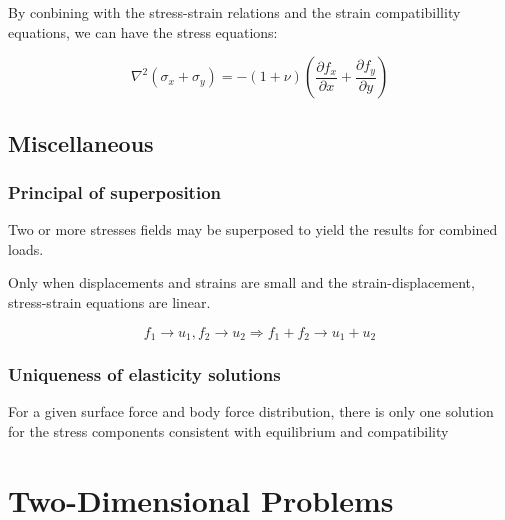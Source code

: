\documentclass[en,hazy,cyan,8pt,normal]{elegantnote}
\numberwithin{equation}{section}
\begin{document}
    By conbining with the stress-strain relations and the strain compatibillity equations, we can have the stress equations:

    \begin{equation}\label{eq:079}
      \nabla^2 (\sigma_x+\sigma_y) = -(1+\nu)\left( \frac{\partial f_x}{\partial x} + \frac{\partial f_y}{\partial y}\right)
    \end{equation}

  \subsection{Miscellaneous}\label{subsec:04.03}
    \subsubsection{Principal of superposition}\label{subsubsec:04.03.01}

      Two or more stresses fields may be superposed to yield the results for combined loads.

      Only when displacements and strains are small and the strain-displacement, stress-strain equations are linear.

      \begin{equation}\label{eq:080}
        f_1\rightarrow u_1, f_2\rightarrow u_2 \Rightarrow f_1+f_2 \rightarrow u_1 + u_2
      \end{equation}

    \subsubsection{Uniqueness of elasticity solutions}\label{subsubsec:04.03.02}

      For a given surface force and body force distribution, there is only one solution for the stress components consistent with equilibrium and compatibility

\section{Two-Dimensional Problems}\label{sec:05}
  
      
\end{document}
